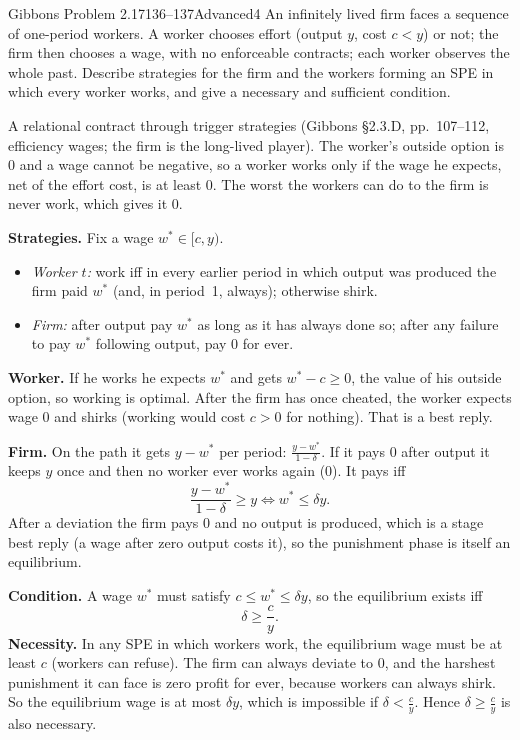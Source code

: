 \begin{exsol}{Gibbons Problem 2.17}{136--137}{Advanced}{4}
\asked An infinitely lived firm faces a sequence of one-period workers. A worker chooses effort (output $y$, cost
$c < y$) or not; the firm then chooses a wage, with no enforceable contracts; each worker observes the whole past.
Describe strategies for the firm and the workers forming an SPE in which every worker works, and give a necessary and
sufficient condition.

\method A relational contract through trigger strategies (Gibbons \S2.3.D, pp.~107--112, efficiency wages; the
firm is the long-lived player). The worker's outside option is $0$ and a wage cannot be negative, so a worker
works only if the wage he expects, net of the effort cost, is at least $0$. The worst the workers can do to the firm
is never work, which gives it $0$.

\solution
\textbf{Strategies.} Fix a wage $w^* \in [c, y)$.
\begin{itemize}
  \item \emph{Worker $t$:} work iff in every earlier period in which output was produced the firm paid $w^*$ (and, in
  period~1, always); otherwise shirk.
  \item \emph{Firm:} after output pay $w^*$ as long as it has always done so; after any failure to pay $w^*$
  following output, pay $0$ for ever.
\end{itemize}
\textbf{Worker.} If he works he expects $w^*$ and gets $w^* - c \ge 0$, the value of his outside option, so working
is optimal. After the firm has once cheated, the worker expects wage $0$ and shirks (working would cost $c > 0$ for
nothing). That is a best reply.

\textbf{Firm.} On the path it gets $y - w^*$ per period: $\frac{y - w^*}{1-\delta}$. If it pays $0$ after output it keeps $y$
once and then no worker ever works again ($0$). It pays iff
\[
  \frac{y - w^*}{1-\delta} \ge y \iff w^* \le \delta y .
\]
After a deviation the firm pays $0$ and no output is produced, which is a stage best reply (a wage after zero output
costs it), so the punishment phase is itself an equilibrium.

\textbf{Condition.} A wage $w^*$ must satisfy $c \le w^* \le \delta y$, so the equilibrium exists iff
\[
  \delta \ge \frac{c}{y} .
\]
\textbf{Necessity.} In any SPE in which workers work, the equilibrium wage must be at least $c$ (workers can
refuse). The firm can always deviate to $0$, and the harshest punishment it can face is zero profit for ever,
because workers can always shirk. So the equilibrium wage is at most $\delta y$, which is impossible if $\delta <
\frac{c}{y}$. Hence $\delta \ge \frac cy$ is also necessary.


\end{exsol}
